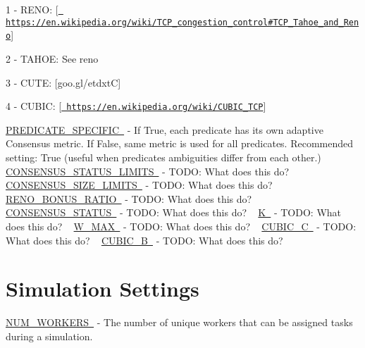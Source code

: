 \begin{DoxyItemize}
\item 1 -\/ R\+E\+NO\+: \mbox{[}\href{https://en.wikipedia.org/wiki/TCP_congestion_control\#TCP_Tahoe_and_Reno}{\texttt{ https\+://en.\+wikipedia.\+org/wiki/\+T\+C\+P\+\_\+congestion\+\_\+control\#\+T\+C\+P\+\_\+\+Tahoe\+\_\+and\+\_\+\+Reno}}\mbox{]}
\item 2 -\/ T\+A\+H\+OE\+: See reno
\item 3 -\/ C\+U\+TE\+: \mbox{[}goo.\+gl/etdxtC\mbox{]}
\item 4 -\/ C\+U\+B\+IC\+: \mbox{[}\href{https://en.wikipedia.org/wiki/CUBIC_TCP}{\texttt{ https\+://en.\+wikipedia.\+org/wiki/\+C\+U\+B\+I\+C\+\_\+\+T\+CP}}\mbox{]}
\end{DoxyItemize}

\mbox{\hyperlink{}{P\+R\+E\+D\+I\+C\+A\+T\+E\+\_\+\+S\+P\+E\+C\+I\+F\+IC }} -\/ If True, each predicate has its own adaptive Consensus metric. If False, same metric is used for all predicates. Recommended setting\+: True (useful when predicates\textquotesingle{} ambiguities differ from each other.) ~\newline
 \mbox{\hyperlink{}{C\+O\+N\+S\+E\+N\+S\+U\+S\+\_\+\+S\+T\+A\+T\+U\+S\+\_\+\+L\+I\+M\+I\+TS }} -\/ T\+O\+DO\+: What does this do? ~\newline
 \mbox{\hyperlink{}{C\+O\+N\+S\+E\+N\+S\+U\+S\+\_\+\+S\+I\+Z\+E\+\_\+\+L\+I\+M\+I\+TS }} -\/ T\+O\+DO\+: What does this do? ~\newline
 \mbox{\hyperlink{}{R\+E\+N\+O\+\_\+\+B\+O\+N\+U\+S\+\_\+\+R\+A\+T\+IO }} -\/ T\+O\+DO\+: What does this do? ~\newline
 \mbox{\hyperlink{}{C\+O\+N\+S\+E\+N\+S\+U\+S\+\_\+\+S\+T\+A\+T\+US }} -\/ T\+O\+DO\+: What does this do? ~\newline
 \mbox{\hyperlink{}{K }} -\/ T\+O\+DO\+: What does this do? ~\newline
 \mbox{\hyperlink{}{W\+\_\+\+M\+AX }} -\/ T\+O\+DO\+: What does this do? ~\newline
 \mbox{\hyperlink{}{C\+U\+B\+I\+C\+\_\+C }} -\/ T\+O\+DO\+: What does this do? ~\newline
 \mbox{\hyperlink{}{C\+U\+B\+I\+C\+\_\+B }} -\/ T\+O\+DO\+: What does this do? ~\newline
 \hypertarget{toggles_sim}{}\section{Simulation Settings}\label{toggles_sim}
\mbox{\hyperlink{}{N\+U\+M\+\_\+\+W\+O\+R\+K\+E\+RS }} -\/ The number of unique workers that can be assigned tasks during a simulation. ~\newline
